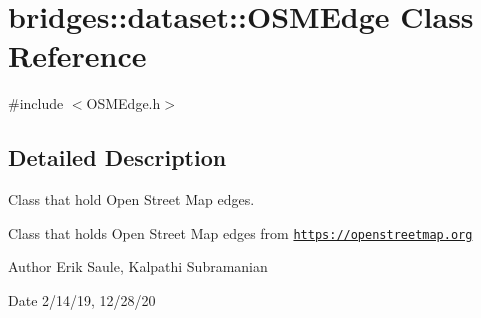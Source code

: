 \hypertarget{classbridges_1_1dataset_1_1_o_s_m_edge}{}\section{bridges\+:\+:dataset\+:\+:O\+S\+M\+Edge Class Reference}
\label{classbridges_1_1dataset_1_1_o_s_m_edge}


{\ttfamily \#include $<$O\+S\+M\+Edge.\+h$>$}



\subsection{Detailed Description}
Class that hold Open Street Map edges. 

Class that holds Open Street Map edges from \href{https://openstreetmap.org}{\tt https\+://openstreetmap.\+org}

\begin{DoxyAuthor}{Author}
Erik Saule, Kalpathi Subramanian 
\end{DoxyAuthor}
\begin{DoxyDate}{Date}
2/14/19, 12/28/20 
\end{DoxyDate}
